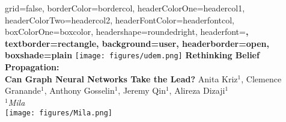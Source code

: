 \documentclass[a0paper,portrait]{baposter}
\begin{document}

\begin{poster}{
grid=false,
borderColor=bordercol, %
headerColorOne=headercol1, %
headerColorTwo=headercol2, %
headerFontColor=headerfontcol, %
boxColorOne=boxcolor, %
headershape=roundedright, %
headerfont=\Large\sf\bf, %
textborder=rectangle,
background=user,
headerborder=open, %
boxshade=plain
}
{\texttt{[image: figures/udem.png]}}
%
%
{ \bf  \Huge {Rethinking Belief Propagation: \\Can Graph Neural Networks Take the Lead?} } %
{\vspace{0.25em} \smaller Anita Kriz$^1$, Clemence Granande$^1$, Anthony Gosselin$^1$, Jeremy Qin$^1$, Alireza Dizaji$^1$   \\  %

\smaller $^1$\it {Mila} \\ } 
{\texttt{[image: figures/Mila.png]}} %

\end{poster}
\end{document}
